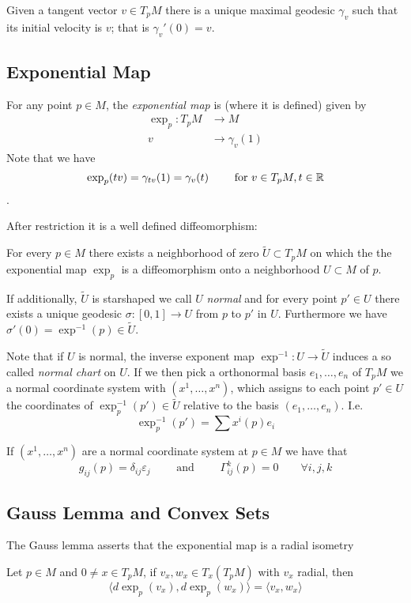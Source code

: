 \begin{proposition}
Given a tangent vector $v\in T_pM$ there is a unique maximal geodesic $\gamma_v$ such that its initial velocity is $v$; that is $\gamma_v'(0)=v$.
\end{proposition}


\subsection{Exponential Map}
For any point $p\in M$, the \emph{exponential map} is (where it is defined) given by
\begin{align*}
    \exp_p:T_pM&\to M\\
    v &\to \gamma_v(1)
\end{align*}
Note that we have \[
\exp_p(tv) = \gamma_{tv}(1) = \gamma_v(t) \qquad \text{ for }v\in T_pM, t\in \mathbb{R} 
\].

After restriction it is a well defined diffeomorphism:
\begin{proposition}
For every $p\in M$ there exists a neighborhood of zero $\widetilde{U}\subset T_pM$ on which the the exponential map $\exp_p$ is a diffeomorphism onto a neighborhood $U\subset M$ of $p$.

If additionally, $\widetilde{U}$ is starshaped we call $U$ \emph{normal} and for every point $p'\in U$ there exists a unique geodesic $\sigma:[0,1]\to U$ from $p$ to $p'$ in $U$. Furthermore we have $\sigma'(0)=\exp^{-1}(p) \in \widetilde{U}$.
\end{proposition}

Note that if $U$ is normal, the inverse exponent map $\exp^{-1}:U\to\widetilde{U}$ induces a so called \emph{normal chart} on $U$. If we then pick a orthonormal basis $e_1,\dots,e_n$ of $T_pM$ we a normal coordinate system with $(x^1,\dots,x^n)$, which assigns to each point $p'\in U$ the coordinates of $\exp_p^{-1}(p') \in \widetilde{U}$ relative to the basis $(e_1,\dots,e_n)$. I.e.
\[
\exp_p^{-1}(p') = \sum x^i(p)e_i
\]
\begin{proposition}
If $(x^1,\dots,x^n)$ are a normal coordinate system at $p\in M$ we have that 
\[
g_{ij}(p) = \delta_{ij}\varepsilon_j \qquad \text{ and } \qquad \Gamma_{ij}^k(p) = 0 \qquad \forall i,j,k
\]
\end{proposition}

\subsection{Gauss Lemma and Convex Sets}
The Gauss lemma asserts that the exponential map is a radial isometry
\begin{lemma}
Let $p\in M$ and $0\neq x\in T_pM$, if $v_x,w_x\in T_x(T_pM)$ with $v_x$ radial, then
\[
\langle d \exp_p(v_x), d \exp_p(w_x)\rangle = \langle v_x, w_x \rangle
\]
\end{lemma}


